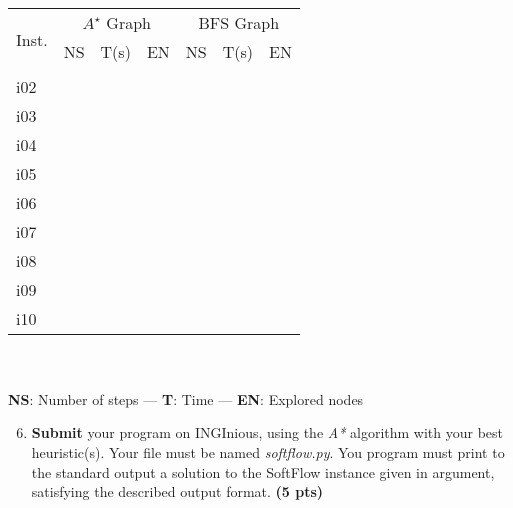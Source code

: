 \documentclass[11pt,a4paper]{report}
\begin{document}
~ 

\begin{answers}[6.5cm]
\begin{center}
\begin{tabular}{||l||l|l|l||l|l|l||}
\hline
\multirow{3}{*}{Inst.} & \multicolumn{3}{c||}{$A^{\star}$ Graph} & \multicolumn{3}{c||}{BFS Graph} \\
 & NS & T(s) & EN & NS & T(s) & EN\\
\hline
i01 & & & & & &\\
\hline
i02 & & & & & &\\
\hline
i03 & & & & & &\\
\hline
i04 & & & & & &\\
\hline
i05 & & & & & &\\
\hline
i06 & & & & & &\\
\hline
i07 & & & & & &\\
\hline
i08 & & & & & &\\
\hline
i09 & & & & & &\\
\hline
i10 & & & & & &\\
\hline
\end{tabular}\\

~\\
\textbf{NS}: Number of steps — \textbf{T}: Time — \textbf{EN}: Explored nodes
\end{center}
\end{answers}



\begin{enumerate}
\setcounter{enumi}{5}
\item \textbf{Submit} your program on INGInious, using the \textit{A*} algorithm with your best heuristic(s).
		 Your file must be named \emph{softflow.py}. 
		 You program must print to the standard output a solution to the SoftFlow instance given in argument, satisfying the described output format.  \textbf{(5 pts)}
\end{enumerate}

\begin{answer}
\end{answer}
\end{document}
